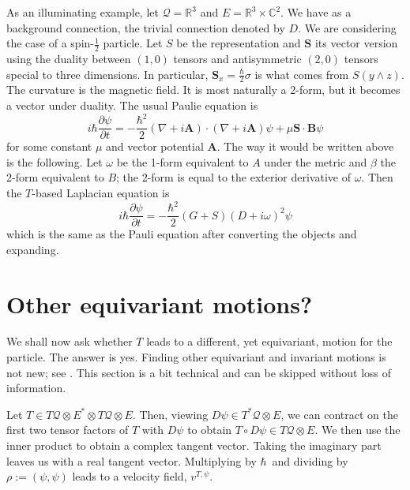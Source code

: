 \documentclass[11pt]{article}
\theoremstyle{remark}
\begin{document}
As an illuminating example, let $\ensuremath{\mathcal{Q}}  = \ensuremath{\mathbb{R}^{3}}$ and $E = \ensuremath{\mathbb{R}^{3}} \times \ensuremath{\mathbb{C}}^2$. We have as a background connection, the trivial
connection denoted by $D$. We are considering the case of 
a spin-$\frac{1}{2}$ particle. Let $S$ be the representation and $\boldsymbol{S}$ its
vector version using the duality between
$(1,0)$ tensors  and antisymmetric $(2,0)$ tensors 
 special to three
dimensions. In particular, $\boldsymbol{S}_x = \frac{\ensuremath{\hbar}}{2} \sigma $ 
is what comes from $S(y\wedge z)$. 
 The curvature is the magnetic field. It is most naturally
a 2-form, but it becomes a vector under duality. The usual Paulie
equation is 
\[
i \ensuremath{\hbar} \ensuremath{\frac{\partial {\ensuremath{\psi}}}{\partial {t}}} 
= -\frac{\ensuremath{\hbar}^2}{2} (\nabla +i\boldsymbol{A})\cdot (\nabla +i\boldsymbol{A}) 
 \ensuremath{\psi} + \mu \boldsymbol{S} \cdot \boldsymbol{B} \ensuremath{\psi}
\]
for some constant $\mu$ and vector potential $\boldsymbol{A}$. The way it
would be written above is the following. Let $\omega$ be the 1-form
equivalent to $A$ under the metric and $\beta$ the 2-form equivalent
to $B$; the 2-form is equal to the exterior derivative of
$\omega$. Then the $T$-based Laplacian equation is 
\[
i \ensuremath{\hbar} \ensuremath{\frac{\partial {\ensuremath{\psi}}}{\partial {t}}} = -\frac{\ensuremath{\hbar}^2}{2} (G + S)(D+i\omega)^2 \ensuremath{\psi}
                   \]
which is the same as the Pauli equation after converting the objects
and expanding. 


\section{Other equivariant motions?}


We shall now ask  whether $T$ leads to a different, yet equivariant, 
 motion for the particle.  The answer is yes. Finding other
 equivariant and invariant motions is not new; see \cite{DG98a, BH95}.
This section is a bit technical and can be skipped without loss of
information. 

Let $T \in \ensuremath{T \ensuremath{\mathcal{Q}}} \otimes \ensuremath{{E}^{*}} \otimes \ensuremath{T \ensuremath{\mathcal{Q}}}  \otimes E$. Then, viewing
$D\ensuremath{\psi} \in \ensuremath{T^{*} \ensuremath{\mathcal{Q}}} \otimes  E$, we can contract on the first two
tensor factors 
of $T$ with $D \ensuremath{\psi}$ to obtain $T \circ D\ensuremath{\psi} \in \ensuremath{T \ensuremath{\mathcal{Q}}} \otimes E$. We
then use the inner product  to obtain a complex tangent vector. Taking
the imaginary part leaves us with a real tangent vector.  Multiplying
by \ensuremath{\hbar}\ and dividing by $\ensuremath{\rho} \ensuremath{:=} {\ensuremath{({\ensuremath{\psi}}, {\ensuremath{\psi}})}}$ leads to a
velocity field, $v^{T, \ensuremath{\psi}}$. 
\end{document}
